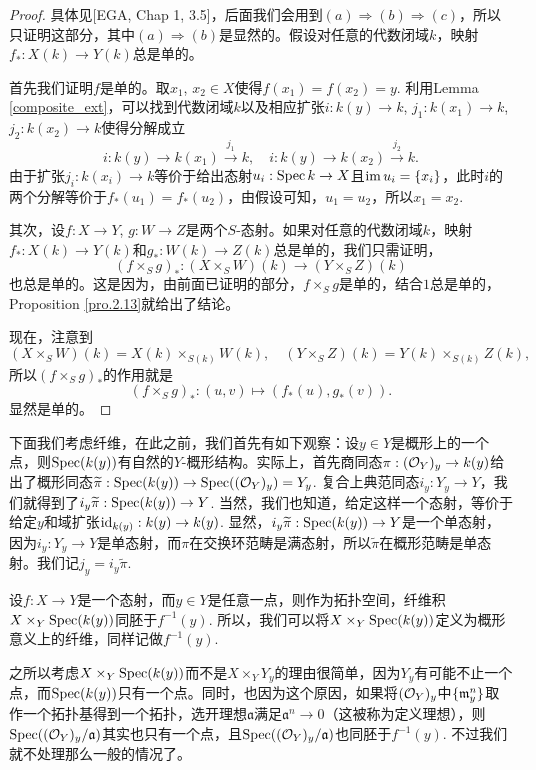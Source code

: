 \begin{proof}
具体见[EGA, Chap 1, 3.5]，后面我们会用到$(a)\Rightarrow (b)\Rightarrow (c)$，所以只证明这部分，其中$(a)\Rightarrow (b)$是显然的。假设对任意的代数闭域$k$，映射$f_*:X(k)\to Y(k)$总是单的。

首先我们证明$f$是单的。取$x_1$, $x_2\in X$使得$f(x_1)=f(x_2)=y$. 利用Lemma \ref{composite_ext}，可以找到代数闭域$k$以及相应扩张$i:k(y)\to k$, $j_1:k(x_1)\to k$, $j_2:k(x_2)\to k$使得分解成立
\[
	i:k(y)\to k(x_1)\xrightarrow{j_1} k,\quad i:k(y)\to k(x_2)\xrightarrow{j_2} k.
\]
由于扩张$j_i:k(x_i)\to k$等价于给出态射$u_i:\operatorname{Spec} k\to X$且$\operatorname{im} u_i=\{x_i\}$，此时$i$的两个分解等价于$f_*(u_1)=f_*(u_2)$，由假设可知，$u_1=u_2$，所以$x_1=x_2$.

其次，设$f:X\to Y$, $g:W\to Z$是两个$S$-态射。如果对任意的代数闭域$k$，映射$f_*:X(k)\to Y(k)$和$g_*:W(k)\to Z(k)$总是单的，我们只需证明，
\[
	(f\times_S g)_*:(X\times_S W)(k)\to (Y\times_S Z)(k)
\]
也总是单的。这是因为，由前面已证明的部分，$f\times_S g$是单的，结合$1$总是单的，Proposition \ref{pro.2.13}就给出了结论。

现在，注意到
\[
	(X\times_S W)(k)=X(k)\times_{S(k)}W(k),\quad (Y\times_S Z)(k)=Y(k)\times_{S(k)}Z(k),
\]
所以$(f\times_S g)_*$的作用就是
\[
	(f\times_S g)_*:(u,v)\mapsto (f_*(u),g_*(v)).
\]
显然是单的。
\end{proof}

下面我们考虑纤维，在此之前，我们首先有如下观察：设$y\in Y$是概形上的一个点，则$\operatorname{Spec} (k(y))$有自然的$Y$-概形结构。实际上，首先商同态$\pi:(\mathcal{O}_{Y})_y\to k(y)$给出了概形同态$\widetilde{\pi}:\operatorname{Spec}(k(y))\to \operatorname{Spec} ((\mathcal{O}_{Y})_y)=Y_y$. 复合上典范同态$i_y:Y_y\to Y$，我们就得到了$i_y\widetilde{\pi}:\operatorname{Spec}(k(y))\to Y$. 当然，我们也知道，给定这样一个态射，等价于给定$y$和域扩张$\operatorname{id}_{k(y)}:k(y)\to k(y)$. 显然，$i_y\widetilde{\pi}:\operatorname{Spec}(k(y))\to Y$是一个单态射，因为$i_y:Y_y\to Y$是单态射，而$\pi$在交换环范畴是满态射，所以$\widetilde{\pi}$在概形范畴是单态射。我们记$j_y=i_y\widetilde{\pi}$.

\begin{pro}[纤维]\label{fiber}
设$f:X\to Y$是一个态射，而$y\in Y$是任意一点，则作为拓扑空间，纤维积$X\times_Y\operatorname{Spec} (k(y))$同胚于$f^{-1}(y)$. 所以，我们可以将$X\times_Y\operatorname{Spec} (k(y))$定义为概形意义上的纤维，同样记做$f^{-1}(y)$.
\end{pro}

之所以考虑$X\times_Y\operatorname{Spec} (k(y))$而不是$X\times_Y Y_y$的理由很简单，因为$Y_y$有可能不止一个点，而$\operatorname{Spec} (k(y))$只有一个点。同时，也因为这个原因，如果将$(\mathcal{O}_Y)_y$中$\{\mathfrak{m}_y^n\}$取作一个拓扑基得到一个拓扑，选开理想$\mathfrak{a}$满足$\mathfrak{a}^n\to 0$（这被称为定义理想），则$\operatorname{Spec}((\mathcal{O}_Y)_y/\mathfrak{a})$其实也只有一个点，且$\operatorname{Spec}((\mathcal{O}_Y)_y/\mathfrak{a})$也同胚于$f^{-1}(y)$. 不过我们就不处理那么一般的情况了。

